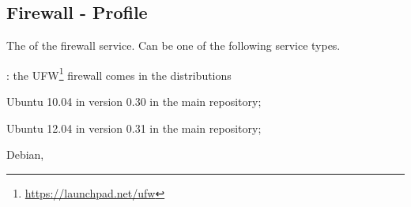 \label{sec:firewall_profile}
\subsection{Firewall - Profile}


The  of the firewall service. Can be one of the following 
service types.
\begin{asparaitem}
%
\item[\qcode{ufw}:] 
the UFW\footnote{\url{https://launchpad.net/ufw}} firewall comes in the distributions 
\begin{compactitem}
\item[\TheDistribution{ubuntu}] Ubuntu 10.04 in version 0.30 in the main repository;
\item[\TheDistribution{ubuntu}] Ubuntu 12.04 in version 0.31 in the main repository;
\item[\TheDistribution{debian}] Debian,
\end{compactitem}
%
\end{asparaitem}

